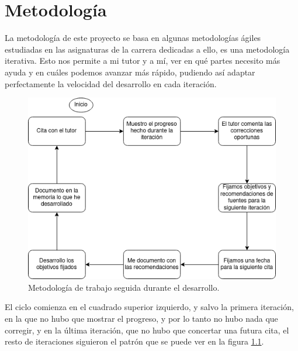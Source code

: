 
\chapter{Metodología}
\label{metodologia}
La metodología de este proyecto se basa en algunas metodologías ágiles estudiadas en las asignaturas de la carrera dedicadas a ello, es una metodología iterativa. Esto nos permite a mi tutor y a mí, ver en qué partes necesito más ayuda y en cuáles podemos avanzar más rápido, pudiendo así adaptar perfectamente la velocidad del desarrollo en cada iteración.
\begin{figure}[h]
	\centering
	\includegraphics[width=15cm]{archivos/imagenes/diagrama-de-metodologia.png}
	\caption{Metodología de trabajo seguida durante el desarrollo.}
	\label{diagrama de metodologia}
\end{figure}

El ciclo comienza en el cuadrado superior izquierdo, y salvo la primera iteración, en la que no hubo que mostrar el progreso, y por lo tanto no hubo nada que corregir, y en la última iteración, que no hubo que concertar una futura cita, el resto de iteraciones siguieron el patrón que se puede ver en la figura \ref{diagrama de metodologia}.

